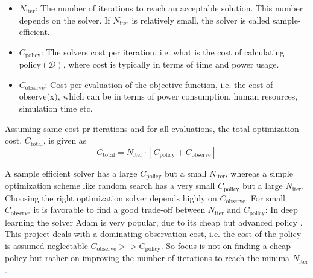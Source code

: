 \begin{itemize}[noitemsep]
    \item $N_{\text{iter}}$: The number of iterations to reach an acceptable solution. This number depends on the
    solver. If $N_{\text{iter}}$ is relatively small, the solver is called sample-efficient. 
    \item $C_{\text{policy}}$: The solvers cost per iteration, i.e. what is the cost of calculating
    $\text{policy}(\mathcal{D})$, where cost is typically in terms of time and power usage. 
    \item $C_{\text{observe}}$: Cost per evaluation of the objective function, i.e. the cost of $\text{observe(x)}$,
    which can be in terms of power consumption, human resources, simulation time etc.
\end{itemize}
Assuming same cost pr iterations and for all evaluations, the total optimization cost, $C_{\text{total}}$, is given as 
$$C_{\text{total}} = N_{\text{iter}} \cdot \left[ C_{\text{policy}} + C_{\text{observe}}\right]$$

A sample efficient solver has a large $C_{\text{policy}}$ but a small $N_{\text{iter}}$, whereas a
simple optimization scheme like random search has a very small $C_{\text{policy}}$ but a large
$N_{\text{iter}}$. Choosing the right optimization solver depends highly on $C_{\text{observe}}$.
For small $C_{\text{observe}}$ it is favorable to find a good trade-off between $N_{\text{iter}}$
and $C_{\text{policy}}$: In deep learning the solver Adam is very popular, due to its cheap
but advanced policy \cite{Adam}. This project deals with a dominating observation cost, i.e. the cost of the policy is assumed
neglectable $C_{\text{observe}}>>C_{\text{policy}}$. So focus is not on finding a cheap policy but rather
on improving the number of iterations to reach the minima $N_{\text{iter}}$.

